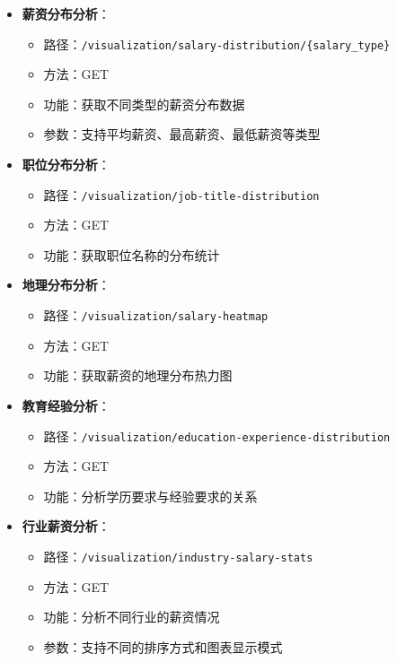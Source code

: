 \begin{itemize}
    \item \textbf{薪资分布分析}：
    \begin{itemize}
        \item 路径：\texttt{/visualization/salary-distribution/\{salary\_type\}}
        \item 方法：GET
        \item 功能：获取不同类型的薪资分布数据
        \item 参数：支持平均薪资、最高薪资、最低薪资等类型
    \end{itemize}
    
    \item \textbf{职位分布分析}：
    \begin{itemize}
        \item 路径：\texttt{/visualization/job-title-distribution}
        \item 方法：GET
        \item 功能：获取职位名称的分布统计
    \end{itemize}
    
    \item \textbf{地理分布分析}：
    \begin{itemize}
        \item 路径：\texttt{/visualization/salary-heatmap}
        \item 方法：GET
        \item 功能：获取薪资的地理分布热力图
    \end{itemize}
    
    \item \textbf{教育经验分析}：
    \begin{itemize}
        \item 路径：\texttt{/visualization/education-experience-distribution}
        \item 方法：GET
        \item 功能：分析学历要求与经验要求的关系
    \end{itemize}
    
    \item \textbf{行业薪资分析}：
    \begin{itemize}
        \item 路径：\texttt{/visualization/industry-salary-stats}
        \item 方法：GET
        \item 功能：分析不同行业的薪资情况
        \item 参数：支持不同的排序方式和图表显示模式
    \end{itemize}
\end{itemize}


